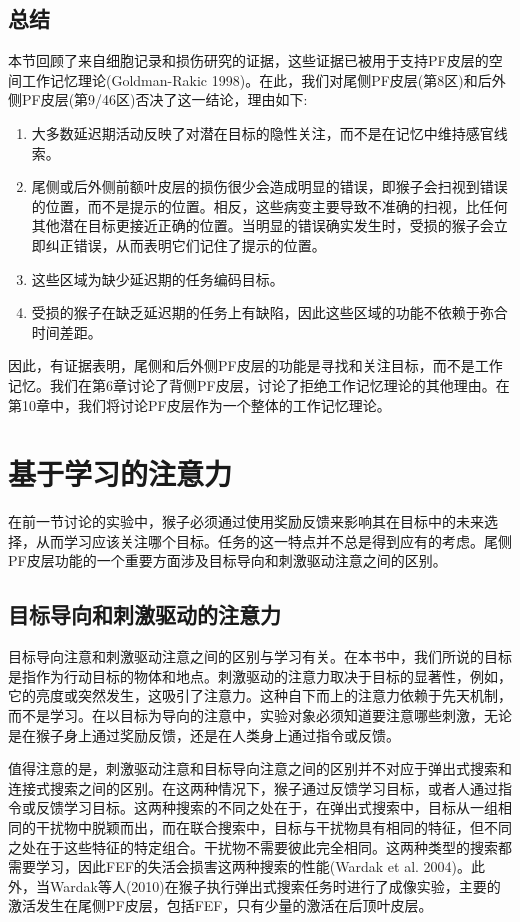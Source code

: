 \subsection{总结}
本节回顾了来自细胞记录和损伤研究的证据，这些证据已被用于支持PF皮层的空间工作记忆理论(Goldman-Rakic 1998)。在此，我们对尾侧PF皮层(第8区)和后外侧PF皮层(第9/46区)否决了这一结论，理由如下:
\begin{enumerate}
	\item 大多数延迟期活动反映了对潜在目标的隐性关注，而不是在记忆中维持感官线索。
	\item 尾侧或后外侧前额叶皮层的损伤很少会造成明显的错误，即猴子会扫视到错误的位置，而不是提示的位置。相反，这些病变主要导致不准确的扫视，比任何其他潜在目标更接近正确的位置。当明显的错误确实发生时，受损的猴子会立即纠正错误，从而表明它们记住了提示的位置。
	\item 这些区域为缺少延迟期的任务编码目标。
	\item 受损的猴子在缺乏延迟期的任务上有缺陷，因此这些区域的功能不依赖于弥合时间差距。
\end{enumerate}
因此，有证据表明，尾侧和后外侧PF皮层的功能是寻找和关注目标，而不是工作记忆。我们在第6章讨论了背侧PF皮层，讨论了拒绝工作记忆理论的其他理由。在第10章中，我们将讨论PF皮层作为一个整体的工作记忆理论。
\section{基于学习的注意力}
在前一节讨论的实验中，猴子必须通过使用奖励反馈来影响其在目标中的未来选择，从而学习应该关注哪个目标。任务的这一特点并不总是得到应有的考虑。尾侧PF皮层功能的一个重要方面涉及目标导向和刺激驱动注意之间的区别。
\subsection{目标导向和刺激驱动的注意力}
目标导向注意和刺激驱动注意之间的区别与学习有关。在本书中，我们所说的目标是指作为行动目标的物体和地点。刺激驱动的注意力取决于目标的显著性，例如，它的亮度或突然发生，这吸引了注意力。这种自下而上的注意力依赖于先天机制，而不是学习。在以目标为导向的注意中，实验对象必须知道要注意哪些刺激，无论是在猴子身上通过奖励反馈，还是在人类身上通过指令或反馈。

值得注意的是，刺激驱动注意和目标导向注意之间的区别并不对应于弹出式搜索和连接式搜索之间的区别。在这两种情况下，猴子通过反馈学习目标，或者人通过指令或反馈学习目标。这两种搜索的不同之处在于，在弹出式搜索中，目标从一组相同的干扰物中脱颖而出，而在联合搜索中，目标与干扰物具有相同的特征，但不同之处在于这些特征的特定组合。干扰物不需要彼此完全相同。这两种类型的搜索都需要学习，因此FEF的失活会损害这两种搜索的性能(Wardak et al. 2004)。此外，当Wardak等人(2010)在猴子执行弹出式搜索任务时进行了成像实验，主要的激活发生在尾侧PF皮层，包括FEF，只有少量的激活在后顶叶皮层。

